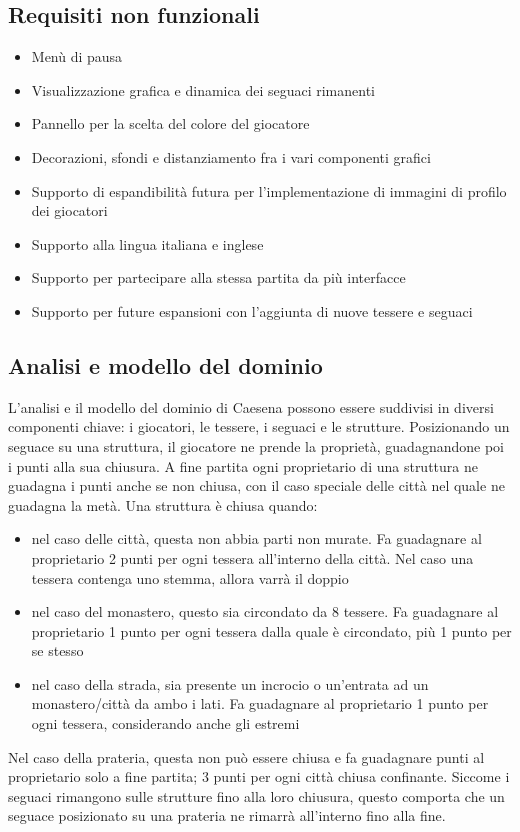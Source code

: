 \subsection*{Requisiti non funzionali}
\begin{itemize}
\item Menù di pausa
\item Visualizzazione grafica e dinamica dei seguaci rimanenti 
\item Pannello per la scelta del colore del giocatore
\item Decorazioni, sfondi e distanziamento fra i vari componenti grafici
\item Supporto di espandibilità futura per l'implementazione di immagini di profilo dei giocatori
\item Supporto alla lingua italiana e inglese
\item Supporto per partecipare alla stessa partita da più interfacce
\item Supporto per future espansioni con l'aggiunta di nuove tessere e seguaci
\end{itemize}

\subsection{Analisi e modello del dominio}

L'analisi e il modello del dominio di Caesena possono essere suddivisi in diversi componenti chiave: i giocatori, le tessere, i seguaci e le strutture. Posizionando un seguace su una struttura, il giocatore ne prende la proprietà, guadagnandone poi i punti alla sua chiusura. A fine partita ogni proprietario di una struttura ne guadagna i punti anche se non chiusa, con il caso speciale delle città nel quale ne guadagna la metà. Una struttura è chiusa quando: 
\begin{itemize}
    \item nel caso delle città, questa non abbia parti non murate. Fa guadagnare al proprietario 2 punti per ogni tessera all'interno della città. Nel caso una tessera contenga uno stemma, allora varrà il doppio
    \item nel caso del monastero, questo sia circondato da 8 tessere. Fa guadagnare al proprietario 1 punto per ogni tessera dalla quale è circondato, più 1 punto per se stesso
    \item nel caso della strada, sia presente un incrocio o un'entrata ad un monastero/città da ambo i lati. Fa guadagnare al proprietario 1 punto per ogni tessera, considerando anche gli estremi
\end{itemize}
Nel caso della prateria, questa non può essere chiusa e fa guadagnare punti al proprietario solo a fine partita; 3 punti per ogni città chiusa confinante. Siccome i seguaci rimangono sulle strutture fino alla loro chiusura, questo comporta che un seguace posizionato su una prateria ne rimarrà all'interno fino alla fine. 

